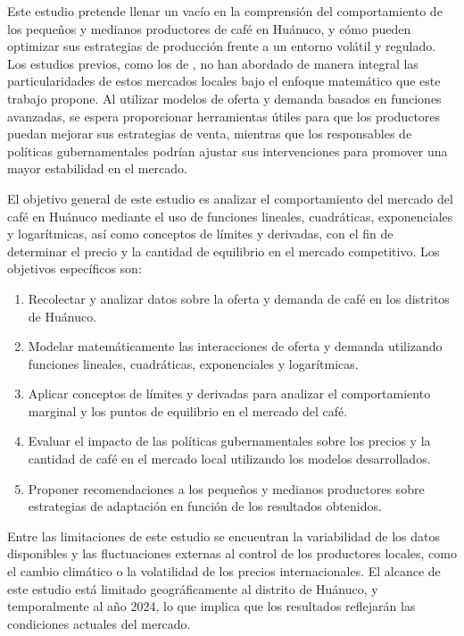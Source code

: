 \documentclass[12pt, a4paper]{article}
\begin{document}
Este estudio pretende llenar un vacío en la comprensión del comportamiento de los pequeños y medianos productores de café en Huánuco, y cómo pueden optimizar sus estrategias de producción frente a un entorno volátil y regulado. Los estudios previos, como los de \parencite{fischer2020}, no han abordado de manera integral las particularidades de estos mercados locales bajo el enfoque matemático que este trabajo propone. Al utilizar modelos de oferta y demanda basados en funciones avanzadas, se espera proporcionar herramientas útiles para que los productores puedan mejorar sus estrategias de venta, mientras que los responsables de políticas gubernamentales podrían ajustar sus intervenciones para promover una mayor estabilidad en el mercado.

El objetivo general de este estudio es analizar el comportamiento del mercado del café en Huánuco mediante el uso de funciones lineales, cuadráticas, exponenciales y logarítmicas, así como conceptos de límites y derivadas, con el fin de determinar el precio y la cantidad de equilibrio en el mercado competitivo. Los objetivos específicos son:

\begin{enumerate}
    \item Recolectar y analizar datos sobre la oferta y demanda de café en los distritos de Huánuco.
    \item Modelar matemáticamente las interacciones de oferta y demanda utilizando funciones lineales, cuadráticas, exponenciales y logarítmicas.
    \item Aplicar conceptos de límites y derivadas para analizar el comportamiento marginal y los puntos de equilibrio en el mercado del café.
    \item Evaluar el impacto de las políticas gubernamentales sobre los precios y la cantidad de café en el mercado local utilizando los modelos desarrollados.
    \item Proponer recomendaciones a los pequeños y medianos productores sobre estrategias de adaptación en función de los resultados obtenidos.
\end{enumerate}

Entre las limitaciones de este estudio se encuentran la variabilidad de los datos disponibles y las fluctuaciones externas al control de los productores locales, como el cambio climático o la volatilidad de los precios internacionales. El alcance de este estudio está limitado geográficamente al distrito de Huánuco, y temporalmente al año 2024, lo que implica que los resultados reflejarán las condiciones actuales del mercado.
\end{document}
